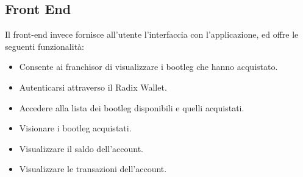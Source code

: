 \subsection{Front End}

Il front-end invece fornisce all'utente l'interfaccia con l'applicazione, ed offre le seguenti funzionalità:
\begin{itemize}
    \item Consente ai franchisor di visualizzare i bootleg che hanno acquistato.
    \item Autenticarsi attraverso il Radix Wallet.
    \item Accedere alla lista dei bootleg disponibili e quelli acquistati.
    \item Visionare i bootleg acquistati.
    \item Visualizzare il saldo dell'account.
    \item Visualizzare le transazioni dell'account.
\end{itemize}

